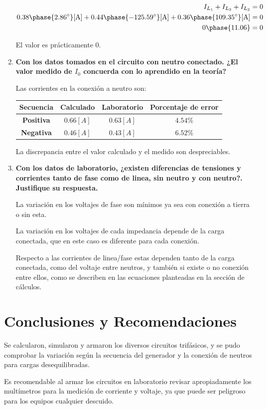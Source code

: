 \documentclass[letter,11pt]{article}
\begin{document}
\begin{enumerate}
\begin{equation*}
    \begin{split}
        I_{L_1}+I_{L_2}+I_{L_3}=0\\
        0.38\phase{2.86^{\circ}}[\text{A}]+
        0.44\phase{-125.59^{\circ}}[\text{A}]+
        0.36\phase{109.35^{\circ}}[\text{A}]=0\\
        0\phase{11.06}=0\\
    \end{split}
\end{equation*}

El valor es prácticamente $0$.

\item \textbf{Con los datos tomados en el circuito con neutro conectado. ¿El
valor medido de $I_0$ concuerda con lo aprendido en la teoría?}

Las corrientes en la conexión a neutro son:
\begin{center}
    \begin{tabular}{|c||c|c|c|}
    \hline
    \textbf{Secuencia} & \textbf{Calculado} & \textbf{Laboratorio} &
    \textbf{Porcentaje de error}
    \tabularnewline \hline \hline
    \textbf{Positiva} & $0.66[A]$ & $0.63[A]$ & $4.54\%$
    \tabularnewline \hline
    \textbf{Negativa} & $0.46[A]$ & $0.43[A]$ & $6.52\%$
    \tabularnewline \hline
    \end{tabular}
\end{center}

La discrepancia entre el valor calculado y el medido son despreciables.

\item \textbf{Con los datos de laboratorio, ¿existen diferencias de tensiones y
corrientes tanto de fase como de linea, sin neutro y con neutro?. Justifique su
respuesta.}

La variación en los voltajes de fase son mínimos ya sea con conexión a tierra o
sin esta.

La variación en los voltajes de cada impedancia depende de la carga conectada,
que en este caso es diferente para cada conexión.

Respecto a las corrientes de linea/fase estas dependen tanto de la carga
conectada, como del voltaje entre neutros, y también si existe o no conexión
entre ellos, como se describen en las ecuaciones planteadas en la sección de
cálculos.

\end{enumerate}

\section{Conclusiones y Recomendaciones}
Se calcularon, simularon y armaron los diversos circuitos trifásicos, y se pudo
comprobar la variación según la secuencia del generador y la conexión de
neutros para cargas desequilibradas.

Es recomendable al armar los circuitos en laboratorio revisar apropiadamente los
multímetros para la medición de corriente y voltaje, ya que puede ser peligroso
para los equipos cualquier descuido.
\end{document}

